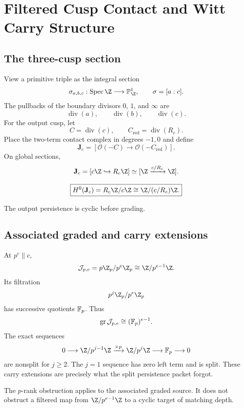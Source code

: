 \clearpage
\section{Filtered Cusp Contact and Witt Carry Structure}

\subsection{The three-cusp section}
View a primitive triple as the integral section
\[
 \sigma_{a,b,c}:
 \Spec\Z\longrightarrow\mathbb P^1_\Z,
 \qquad
 \sigma=[a:c].
\]
The pullbacks of the boundary divisors $0$, $1$, and $\infty$ are
\[
 \operatorname{div}(a),
 \qquad
 \operatorname{div}(b),
 \qquad
 \operatorname{div}(c).
\]
For the output cusp, let
\[
 C=\operatorname{div}(c),
 \qquad
 C_{\mathrm{red}}=\operatorname{div}(R_c).
\]
Place the two-term contact complex in degrees $-1,0$ and define
\[
 \boxed{
 \mathbf J_c
 =
 [\mathcal O(-C)\longrightarrow\mathcal O(-C_{\mathrm{red}})].
 }
\]
On global sections,
\[
 \mathbf J_c
 =
 [c\Z\hookrightarrow R_c\Z]
 \simeq
 [\Z\xrightarrow{c/R_c}\Z].
\]

\begin{theorem}
\[
 \boxed{
 H^0(\mathbf J_c)
 =
 R_c\Z/c\Z
 \cong
 \Z/(c/R_c)\Z.
 }
\]
\end{theorem}

The output persistence is cyclic before grading.

\subsection{Associated graded and carry extensions}
At $p^e\parallel c$,
\[
 \Jcal_{p,e}
 =
 p\Z_p/p^e\Z_p
 \cong
 \Z/p^{e-1}\Z.
\]
Its filtration
\[
 p^j\Z_p/p^e\Z_p
\]
has successive quotients $\mathbb F_p$. Thus
\[
 \operatorname{gr}\mathcal J_{p,e}\cong(\mathbb F_p)^{e-1}.
\]
The exact sequences
\[
 0\longrightarrow
 \Z/p^{j-1}\Z
 \xrightarrow{\times p}
 \Z/p^j\Z
 \longrightarrow
 \F_p
 \longrightarrow0
\]
are nonsplit for $j\ge2$. The $j=1$ sequence has zero left term and is split. These carry extensions are precisely what the split persistence packet forgot.

\begin{corollary}
The $p$-rank obstruction applies to the associated graded source. It does not obstruct a filtered map from $\Z/p^{e-1}\Z$ to a cyclic target of matching depth.
\end{corollary}

